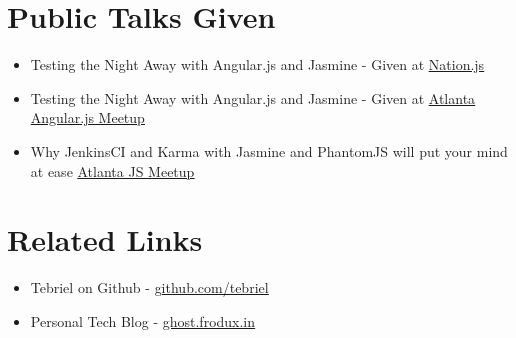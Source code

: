 \documentclass[margin]{res}
\begin{document}
\begin{resume}
\section{Public Talks Given}
    \begin{itemize}
        \item Testing the Night Away with Angular.js and Jasmine - Given at
            \href{http://nationjs.com/}{\underline{Nation.js}}
        \item Testing the Night Away with Angular.js and Jasmine - Given at
            \href{http://www.meetup.com/AngularJS-ATL/}{\underline{Atlanta
            Angular.js Meetup}}
        \item Why JenkinsCI and Karma with Jasmine and PhantomJS will put your
            mind at ease
            \href{http://www.meetup.com/AtlantaJavaScript/}{\underline{Atlanta
            JS Meetup}}
    \end{itemize}

\section{Related Links}
    \begin{itemize}
        \item Tebriel on Github - \href{https://github.com/tebriel}{\underline{github.com/tebriel}}
        \item Personal Tech Blog - \href{http://ghost.frodux.in/}{\underline{ghost.frodux.in}}
    \end{itemize}

\end{resume}
\end{document}
